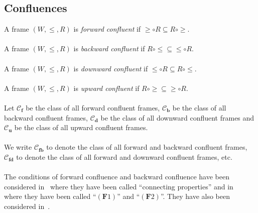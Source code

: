 \documentclass[draft]{article}
\def\bcfra{\mathbf{b}}
\def\fcfra{\mathbf{f}}
\def\fbcfra{\mathbf{fb}}
\def\fdcfra{\mathbf{fd}}
\def\dcfra{\mathbf{d}}
\def\ucfra{\mathbf{u}}
\begin{document}
\subsection{Confluences}
%
%
A frame $(W,{\leq},{R})$ is {\em forward confluent}\/ if ${\geq}{\circ}{R}{\subseteq}{R}{\circ}{\geq}$.
%
%
\\
\\
%
%
A frame $(W,{\leq},{R})$ is {\em backward confluent}\/ if ${R}{\circ}{\leq}{\subseteq}{\leq}{\circ}{R}$.
%
%
\\
\\
%
%
A frame $(W,{\leq},{R})$ is {\em downward confluent}\/ if ${\leq}{\circ}{R}{\subseteq}{R}{\circ}{\leq}$.
%
%
\\
\\
%
%
A frame $(W,{\leq},{R})$ is {\em upward confluent}\/ if ${R}{\circ}{\geq}{\subseteq}{\geq}{\circ}{R}$.
%
%
%
%
%
%
%
%
%
%
%
%
%
%
\\
\\
%
%
Let ${\mathcal C}_{\fcfra}$ be the class of all forward confluent frames, ${\mathcal C}_{\bcfra}$ be the class of all backward confluent frames, ${\mathcal C}_{\dcfra}$ be the class of all downward confluent frames and ${\mathcal C}_{\ucfra}$ be the class of all upward confluent frames.
%
%
\\
\\
%
%
We write ${\mathcal C}_{\fbcfra}$ to denote the class of all forward and backward confluent frames, ${\mathcal C}_{\fdcfra}$ to denote the class of all forward and downward confluent frames, etc.
%
%
\\
\\
%
%
The conditions of forward confluence and backward confluence have been considered in~\cite{FischerServi:1984} where they have been called ``connecting properties'' and in~\cite[Chapter~$3$]{Simpson:1994} where they have been called ``$(\mathbf{F}1)$'' and ``$(\mathbf{F}2)$''.
They have also been considered in~\cite{Marin:et:al:2021,Plotkin:Stirling:1986}.
\end{document}
